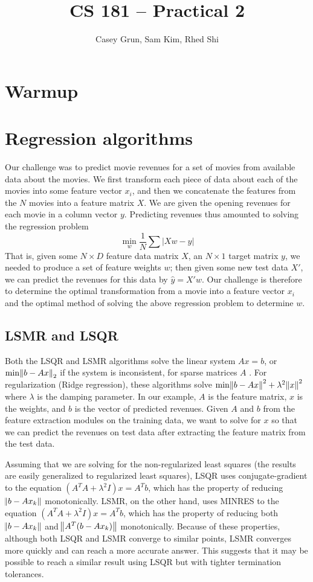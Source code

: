 \documentclass[11pt]{amsart}
\title{CS 181 -- Practical 2}
\author{Casey Grun, Sam Kim, Rhed Shi}
\begin{document}
\maketitle

\section{Warmup}

\section{Regression algorithms}

Our challenge was to predict movie revenues for a set of movies from available data about the movies. We first transform each piece of data about each of the movies into some feature vector $x_i$, and then we concatenate the features from the $N$ movies into a feature matrix $X$. We are given the opening revenues for each movie in a column vector $y$. Predicting revenues thus amounted to solving the regression problem
$$\min_w \frac{1}{N}\sum |X w - y|$$
That is, given some $N \times D$ feature data matrix $X$, an $N \times 1$ target matrix $y$, we needed to produce a set of feature weights $w$; then given some new test data $X'$, we can predict the revenues for this data by $\hat{y} = X' w$. Our challenge is therefore to determine the optimal transformation from a movie into a feature vector $x_i$ and the optimal method of solving the above regression problem to determine $w$. 

\subsection{LSMR and LSQR}

Both the LSQR and LSMR algorithms solve the linear system $Ax=b$, or $\text{min}\norm{b-Ax}_2$ if the system is inconsistent, for sparse matrices $A$ \cite{LSMR}. For regularization (Ridge regression), these algorithms solve $\text{min}\norm{b-Ax}^2+\lambda^2\norm{x}^2$ where $\lambda$ is the damping parameter. In our example, $A$ is the feature matrix, $x$ is the weights, and $b$ is the vector of predicted revenues. Given $A$ and $b$ from the feature extraction modules on the training data, we want to solve for $x$ so that we can predict the revenues on test data after extracting the feature matrix from the test data.

Assuming that we are solving for the non-regularized least squares (the results are easily generalized to regularized least squares), LSQR uses conjugate-gradient to the equation $(A^TA+\lambda^2I)x=A^Tb$, which has the property of reducing $\norm{b-Ax_k}$ monotonically. LSMR, on the other hand, uses MINRES to the equation $(A^TA+\lambda^2I)x=A^Tb$, which has the property of reducing both $\norm{b-Ax_k}$ and $\norm{A^T(b-Ax_k)}$ monotonically. Because of these properties, although both LSQR and LSMR converge to similar points, LSMR converges more quickly and can reach a more accurate answer. This suggests that it may be possible to reach a similar result using LSQR but with tighter termination tolerances.
\end{document}
